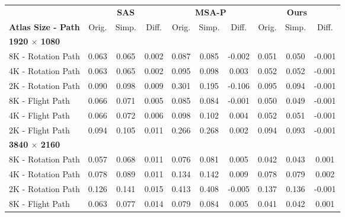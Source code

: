 \begin{table}
\scriptsize
\setlength{\tabcolsep}{2pt}
\centering
\begin{tabular}{l|ccc|ccc|ccc}
 & \multicolumn{3}{c|}{\textbf{SAS}} & \multicolumn{3}{c|}{\textbf{MSA-P}} & \multicolumn{3}{c}{\textbf{Ours}} \\
\textbf{Atlas Size - Path} & Orig.        & Simp.     & Diff.     & Orig.          & Simp.     & Diff.     & Orig.         & Simp.     & Diff.                \\
\hline
\textbf{1920 $\times$ 1080} & & & & & & & & & \\
8K - Rotation Path         & 0.063        & 0.065     & 0.002     & 0.087          & 0.085     & -0.002    & 0.051         & 0.050     & -0.001               \\
4K - Rotation Path         & 0.063        & 0.065     & 0.002     & 0.095          & 0.098     & 0.003     & 0.052         & 0.052     & -0.001               \\
2K - Rotation Path         & 0.090        & 0.098     & 0.009     & 0.301          & 0.195     & -0.106    & 0.095         & 0.094     & -0.001               \\
8K - Flight Path           & 0.066        & 0.071     & 0.005     & 0.085          & 0.084     & -0.001    & 0.050         & 0.049     & -0.001               \\
4K - Flight Path           & 0.066        & 0.072     & 0.006     & 0.098          & 0.102     & 0.004     & 0.052         & 0.051     & -0.001               \\
2K - Flight Path           & 0.094        & 0.105     & 0.011     & 0.266          & 0.268     & 0.002     & 0.094         & 0.093     & -0.001               \\
\hline
\textbf{3840 $\times$ 2160} & & & & & & & & & \\
8K - Rotation Path         & 0.057        & 0.068     & 0.011     & 0.076          & 0.081     & 0.005     & 0.042         & 0.043     & 0.001                \\
4K - Rotation Path         & 0.078        & 0.089     & 0.011     & 0.134          & 0.142     & 0.009     & 0.078         & 0.079     & 0.002                \\
2K - Rotation Path         & 0.126        & 0.141     & 0.015     & 0.413          & 0.408     & -0.005    & 0.137         & 0.136     & -0.001               \\
8K - Flight Path           & 0.063        & 0.077     & 0.014     & 0.079          & 0.084     & 0.005     & 0.041         & 0.042     & 0.001                \\

\end{tabular}
\end{table}
